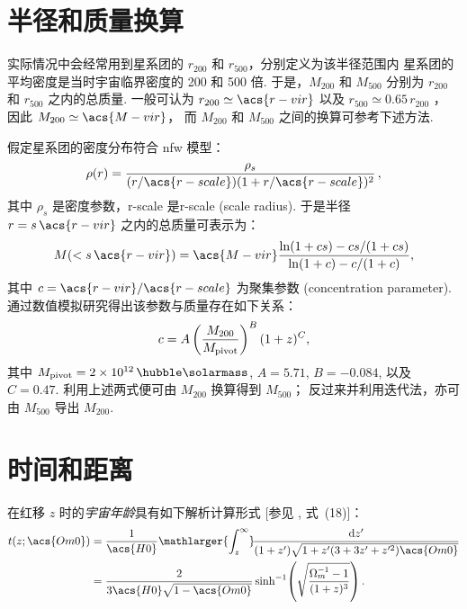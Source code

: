 \section{半径和质量换算}

实际情况中会经常用到星系团的 $r_{200}$ 和 $r_{500}$，分别定义为该半径范围内
星系团的平均密度是当时宇宙临界密度的 200 和 500 倍.
于是，$M_{200}$ 和 $M_{500}$ 分别为 $r_{200}$ 和 $r_{500}$ 之内的总质量.
一般可认为 $r_{200} \simeq \acs{r-vir}$
以及 $r_{500} \simeq 0.65 \, r_{200}$ \cite{ettori2009}，
因此 $M_{200} \simeq \acs{M-vir}$，
而 $M_{200}$ 和 $M_{500}$ 之间的换算可参考下述方法.

假定星系团的密度分布符合 \ac{nfw} 模型\cite{navarro1997}：
\begin{equation}
  \label{eq:nfw}
  \rho(r) = \frac{\rho_s}{
    (r / \acs{r-scale}) (1 + r / \acs{r-scale})^2} \,,
\end{equation}
其中 $\rho_s$ 是密度参数，\acs{r-scale} 是\acl{r-scale} (scale radius).
于是半径 $r = s \,\acs{r-vir}$ 之内的总质量可表示为\cite{lokas2001}：
\begin{equation}
  \label{eq:mass-r}
  M(< s \,\acs{r-vir}) = \acs{M-vir}
    \frac{\ln(1 + c s) - c s / (1 + c s)}{\ln(1 + c) - c / (1 + c)} ,
\end{equation}
其中 $c = \acs{r-vir} / \acs{r-scale}$ 为聚集参数 (concentration parameter).
 通过数值模拟研究得出该参数与质量存在如下关系：
\begin{equation}
  \label{eq:mass-c}
  c = A \left( \frac{M_{200}}{M_{\mathrm{pivot}}} \right)^B (1+z)^C ,
\end{equation}
其中 $M_{\R{pivot}} = \SI{2e12}{\per\hubble\solarmass}$,
$A = 5.71$, $B = -0.084$, 以及 $C = 0.47$.
利用上述两式便可由 $M_{200}$ 换算得到 $M_{500}$；
反过来并利用迭代法，亦可由 $M_{500}$ 导出 $M_{200}$.


\section{时间和距离}

在红移 $z$ 时的\emph{宇宙年龄}具有如下解析计算形式
[参见 , 式~(18)]：
\begin{align}
  \label{eq:universe-age}
  t(z; \acs{Om0})
    & = \frac{1}{\acs{H0}} \mathlarger{\int_z^{\infty}}
      \!\frac{\D{z'}}{(1+z')\sqrt{1 + z' (3+3z'+z'^2) \acs{Om0}}}
      \nonumber \\
    & = \frac{2}{3 \acs{H0} \sqrt{1-\acs{Om0}}} \sinh^{-1}
      \!\left( \sqrt{\frac{\Omega_m^{-1} - 1}{(1+z)^3}} \right).
\end{align}

